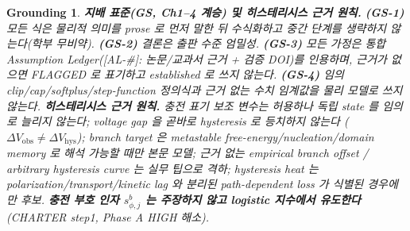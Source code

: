 \documentclass[11pt,a4paper]{article}
\newtheorem*{groundingbox}{Grounding}
\newcommand{\hys}{\mathrm{hys}}
\newcommand{\obs}{\mathrm{obs}}
\newcommand{\AL}[1]{\textsf{[AL-#1]}}
\begin{document}
\begin{groundingbox}
\textbf{지배 표준(GS, Ch1--4 계승) 및 히스테리시스 근거 원칙.} \textbf{(GS-1)} 모든 식은 물리적 의미를 prose 로
먼저 말한 뒤 수식화하고 중간 단계를 생략하지 않는다(학부 무비약). \textbf{(GS-2)} 결론은 출판 수준 엄밀성.
\textbf{(GS-3)} 모든 가정은 통합 Assumption Ledger(\AL{\#}: 논문/교과서 근거 + 검증 DOI)를 인용하며, 근거가
없으면 FLAGGED 로 표기하고 established 로 쓰지 않는다. \textbf{(GS-4)} 임의 clip/cap/softplus/step-function
정의식과 근거 없는 수치 임계값을 물리 모델로 쓰지 않는다. \textbf{히스테리시스 근거 원칙.} 충전 표기 보조
변수는 허용하나 독립 state 를 임의로 늘리지 않는다; voltage gap 을 곧바로 hysteresis 로 등치하지 않는다
($\Delta V_\obs\ne\Delta V_\hys$); branch target 은 metastable free-energy/nucleation/domain memory 로 해석
가능할 때만 본문 모델; 근거 없는 empirical branch offset / arbitrary hysteresis curve 는 실무 팁으로 격하;
hysteresis heat 는 polarization/transport/kinetic lag 와 분리된 path-dependent loss 가 식별된 경우에만 후보.
\textbf{충전 부호 인자 $s_{\phi,j}^b$ 는 주장하지 않고 logistic 지수에서 유도한다}(CHARTER step1, Phase A
HIGH 해소).
\end{groundingbox}

\tableofcontents
\newpage

\end{document}

